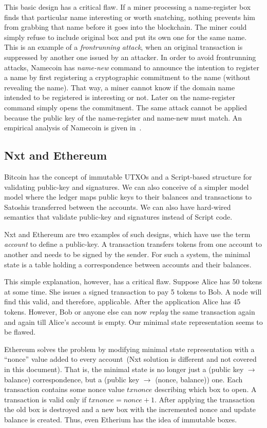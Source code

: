 \documentclass[]{report}   %
\begin{document}
This basic design has a critical flaw. If a miner processing a name-register box finds that particular name interesting or worth snatching, nothing prevents him from grabbing that name before it goes into the blockchain. The miner could simply refuse to include original box and put its own one for the same name. This is an example of a
\textit{frontrunning attack}, when an original transaction is suppressed by another one issued by an attacker. In order to avoid frontrunning attacks, Namecoin has \textit{name-new} command to announce the intention to register a name by first registering a cryptographic commitment to the name (without revealing the name). That way, a miner cannot know if the domain name intended to be registered is interesting or not. Later on the name-register command simply opens the commitment. The same attack cannot be applied because the public key of the name-register and name-new must match. An empirical analysis of Namecoin is given in~\cite{kalodner2015empirical}.


\subsection{Nxt and Ethereum}	

Bitcoin has the concept of immutable UTXOs and a Script-based structure for validating public-key and signatures. We can also conceive of a simpler model model where the ledger maps public keys to their balances and transactions to Satoshis transferred between the accounts. We can also have hard-wired semantics that validate public-key and signatures instead of Script code.

Nxt and Ethereum are two examples of such designs, which have use the term {\em account} to define a public-key. A transaction transfers tokens from one account to another and needs to be signed by the sender. For such a system, the minimal state is a table holding a correspondence between accounts and their balances.

This simple explanation, however, has a critical flaw. Suppose Alice has 50 tokens at some time. She issues a signed transaction to pay 5 tokens to Bob. A node will find this valid, and therefore, applicable. After the application Alice has 45 tokens. However, Bob or anyone else can now {\em replay} the same transaction again and again till Alice's account is empty. Our minimal state representation seems to be flawed.

Ethereum solves the problem by modifying minimal state representation with a ``nonce'' value added to every account~(Nxt solution is different and not covered in this document). That is, the minimal state is no longer just a (public key $\rightarrow$ balance) correspondence, but a (public key $\rightarrow$ (nonce, balance)) one. Each transaction contains some nonce value \(txnonce\) describing which box to open. A transaction is valid only if \(txnonce = nonce + 1\). After applying the transaction the old box is destroyed and a new box with the incremented nonce and update balance is created. Thus, even Etherium has the idea of immutable boxes.
\end{document}
